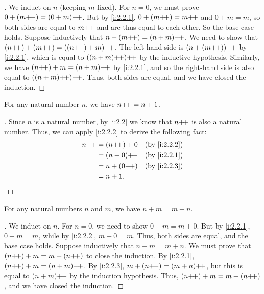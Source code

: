 \begin{proof}[]
  We induct on \(n\) (keeping \(m\) fixed).
  For \(n = 0\), we must prove \(0 + (m{+}\!{+}) = (0 + m){+}\!{+}\).
  But by \cref{i:2.2.1}, \(0 + (m{+}\!{+}) = m{+}\!{+}\) and \(0 + m = m\), so both sides are equal to \(m{+}\!{+}\) and are thus equal to each other.
  So the base case holds.
  Suppose inductively that \(n + (m{+}\!{+}) = (n + m){+}\!{+}\).
  We need to show that \((n{+}\!{+}) + (m{+}\!{+}) = ((n{+}\!{+}) + m){+}\!{+}\).
  The left-hand side is \((n + (m{+}\!{+})){+}\!{+}\) by \cref{i:2.2.1}, which is equal to \(((n+m){+}\!{+}){+}\!{+}\) by the inductive hypothesis.
  Similarly, we have \((n{+}\!{+}) + m = (n + m){+}\!{+}\) by \cref{i:2.2.1}, and so the right-hand side is also equal to \(((n + m){+}\!{+}){+}\!{+}\).
  Thus, both sides are equal, and we have closed the induction.
\end{proof}

\begin{ac}\label{i:ac:2.2.2}
  For any natural number \(n\), we have \(n{+}\!{+} = n + 1\).
\end{ac}

\begin{proof}[]
  Since \(n\) is a natural number, by \cref{i:2.2} we know that \(n{+}\!{+}\) is also a natural number.
  Thus, we can apply \cref{i:2.2.2} to derive the following fact:
  \begin{align*}
    n\pp & = (n\pp) + 0 &  & \by{i:2.2.2} \\
         & = (n + 0)\pp &  & \by{i:2.2.1} \\
         & = n + (0\pp) &  & \by{i:2.2.3} \\
         & = n + 1.
  \end{align*}
\end{proof}

\begin{prop}\label{i:2.2.4}
  For any natural numbers \(n\) and \(m\), we have \(n + m = m + n\).
\end{prop}

\begin{proof}[]
  We induct on \(n\).
  For \(n = 0\), we need to show \(0 + m = m + 0\).
  But by \cref{i:2.2.1}, \(0 + m = m\), while by \cref{i:2.2.2}, \(m + 0 = m\).
  Thus, both sides are equal, and the base case holds.
  Suppose inductively that \(n + m = m + n\).
  We must prove that \((n{+}\!{+}) + m = m + (n{+}\!{+})\) to close the induction.
  By \cref{i:2.2.1}, \((n{+}\!{+}) + m = (n + m){+}\!{+}\).
  By \cref{i:2.2.3}, \(m + (n{+}\!{+}) = (m + n){+}\!{+}\), but this is equal to \((n + m){+}\!{+}\) by the induction hypothesis.
  Thus, \((n{+}\!{+}) + m = m + (n{+}\!{+})\), and we have closed the induction.
\end{proof}


